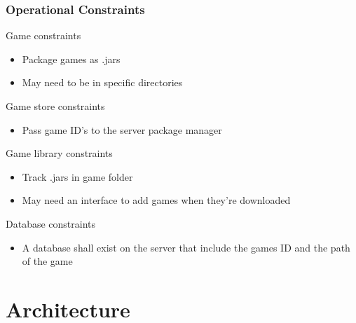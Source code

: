 \documentclass{beamer}
\begin{document}
\begin{frame}
    \frametitle{Operational Constraints}
    
    Game constraints

    \begin{itemize}
        \item   Package games as .jars
        \item   May need to be in specific directories
    \end{itemize}
    
    Game store constraints

    \begin{itemize}
        \item   Pass game ID's to the server package manager
    \end{itemize}
    
    Game library constraints

    \begin{itemize}
        \item   Track .jars in game folder
        \item   May need an interface to add games when they're downloaded
    \end{itemize}

    Database constraints

    \begin{itemize}
        \item   A database shall exist on the server that include the games 
                ID and the path of the game
    \end{itemize}

\end{frame}


\section{Architecture} %
\subsection{}
\end{document}
